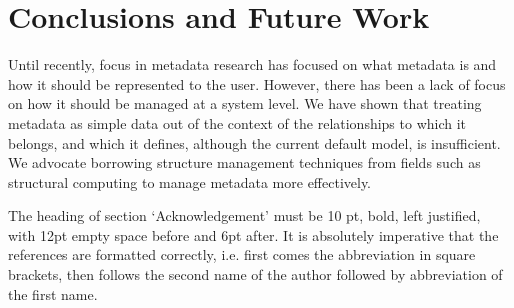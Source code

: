\documentclass[10pt, a4paper, oneside]{article}
\begin{document}
\section{Conclusions and Future Work}

Until recently, focus in metadata research has focused on what
metadata is and how it should be represented to the user.  However,
there has been a lack of focus on how it should be managed at a system
level.  We have shown that treating metadata as simple data out of the
context of the relationships to which it belongs, and which it
defines, although the current default model, is insufficient.  We
advocate borrowing structure management techniques from fields such as
structural computing to manage metadata more effectively.

\begin{Acknowledgements}
The heading of section ‘Acknowledgement’ must be 10 pt, bold, left justified, with 12pt empty space before and 6pt after. It is absolutely imperative that the references are formatted correctly, i.e. first comes the abbreviation in square brackets, then follows the second name of the author followed by abbreviation of the first name.
\end{Acknowledgements}
\end{document}
